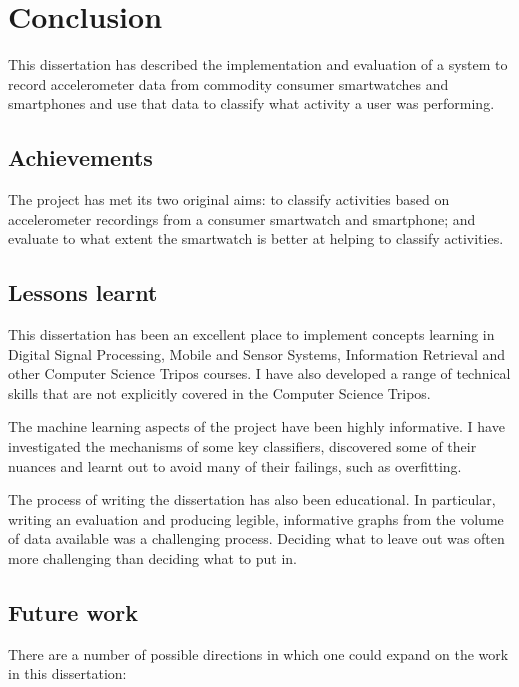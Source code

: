 \chapter{Conclusion}
  This dissertation has described the implementation and evaluation of a system to record accelerometer data from commodity consumer smartwatches and smartphones and use that data to classify what activity a user was performing.
  
  \section{Achievements}
    The project has met its two original aims: to classify activities based on accelerometer recordings from a consumer smartwatch and smartphone; and evaluate to what extent the smartwatch is better at helping to classify activities.
    
  \section{Lessons learnt}
    This dissertation has been an excellent place to implement concepts learning in Digital Signal Processing, Mobile and Sensor Systems, Information Retrieval and other Computer Science Tripos courses. I have also developed a range of technical skills that are not explicitly covered in the Computer Science Tripos.
    
    The machine learning aspects of the project have been highly informative. I have investigated the mechanisms of some key classifiers, discovered some of their nuances and learnt out to avoid many of their failings, such as overfitting.
    
    The process of writing the dissertation has also been educational. In particular, writing an evaluation and producing legible, informative graphs from the volume of data available was a challenging process. Deciding what to leave out was often more challenging than deciding what to put in.
  \section{Future work}
    There are a number of possible directions in which one could expand on the work in this dissertation:
    
